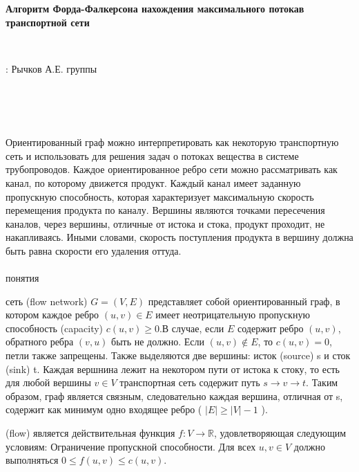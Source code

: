 \documentclass[12pt]{article}
\begin{document}
	
	\begin{center}
		{\large{\bf Алгоритм Форда-Фалкерсона нахождения максимального потока\newline в транспортной сети}}
	\end{center}
	~\\
	
	\begin{flushright}
		: Рычков А.Е.
		 группы
	\end{flushright}
	~\\
	~\\
	{\large{}}
	~\\
	\par Ориентированный граф можно интерпретировать как некоторую транспортную сеть и использовать для решения задач о потоках вещества в системе трубопроводов. Каждое ориентированное ребро сети можно рассматривать как канал, по которому движется продукт. Каждый канал имеет заданную пропускную способность, которая характеризует максимальную скорость перемещения продукта по каналу. Вершины являются точками пересечения каналов, через вершины, отличные от истока и стока, продукт проходит, не накапливаясь. Иными словами, скорость поступления продукта в вершину должна быть равна скорости его удаления оттуда.
	~\\
	~\\
	{\large{ понятия}}
	~\\
	\par { сеть} (flow network) $G = (V, E)$ представляет собой ориентированный граф, в котором каждое ребро $(u, v) \in E$ имеет неотрицательную пропускную способность (capacity) $c(u,v) \ge 0$.В случае, если $E$ содержит ребро $(u, v)$, обратного ребра $(v, u)$ быть не должно. Если $(u,v)\notin E$, то $c(u,v)=0$, петли также запрещены. Также выделяются две вершины: исток (source) s и сток (sink) t. Каждая вершнина лежит на некотором пути от истока к стоку, то есть для любой вершины $v \in V$ транспортная сеть содержит путь $s \rightarrow v \rightarrow t$. Таким образом, граф является связным, следовательно каждая вершина, отличная от s, содержит как минимум одно входящее ребро ( $|E| \ge |V| - 1$ ).
	\par{}(flow) является действительная функция $f : V \rightarrow \mathbb{R}$, удовлетворяющая следующим условиям:\newline
	Ограничение пропускной способности. Для всех $u, v \in V$ должно выполняться $0 \le f(u,v) \le c(u,v)$.\newline
\end{document}
